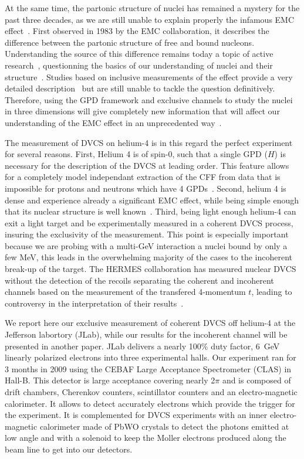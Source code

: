 \documentclass[%
 reprint,
 amsmath,amssymb,
 aps,
]{revtex4-1}
\begin{document}
At the same time, the partonic structure of nuclei has remained a mystery
for the past three decades, as we are still unable to explain properly the 
infamous EMC effect~\cite{}. First observed in 1983 by the EMC 
collaboration, it describes the difference between the partonic structure of
free and bound nucleons. Understanding the source of this difference remains 
today a topic of active research~\cite{},
questionning the basics of our understanding of nuclei and their 
structure~\cite{}. Studies based on inclusive measurements of the
effect provide a very detailed description~\cite{} but 
are still unable to tackle the question definitively. Therefore,
using the GPD framework and exclusive channels to study the nuclei in three 
dimensions will give completely new information that will affect our understanding
of the EMC effect in an unprecedented way~\cite{}. 

The measurement of DVCS on helium-4 is in this regard the perfect experiment for
several reasons. First, Helium 4 is of spin-0, such that a single GPD ($H$) is
necessary for the description of the DVCS at leading order. This feature allows for a
completely model independant extraction of the CFF from data that is impossible for 
protons and neutrons which have 4 GPDs~\cite{}. Second, 
helium 4 is dense and experience 
already a significant EMC effect, while being simple enough that its nuclear
structure is well known~\cite{}. Third, being 
light enough helium-4 can exit
a light target and be experimentally measured in a coherent DVCS process, 
insuring the exclusivity of the 
measurement. This point is especially important because we are probing with a 
multi-GeV interaction a nuclei bound by only a few MeV, this leads in the 
overwhelming majority of the cases to the incoherent break-up of the target.
The HERMES collaboration has measured nuclear DVCS~\cite{} without the 
detection of the recoils separating the coherent and incoherent channels 
based on the measurement of the transfered 4-momentum $t$, leading
to controversy in the interpretation of their results~\cite{}.

We report here our exclusive measurement of coherent DVCS off helium-4 
at the Jefferson labortory
(JLab), while our results for the incoherent channel will be presented in
another paper. JLab delivers a nearly 100\% duty factor, 6~GeV linearly 
polarized electrons into three experimental halls. Our experiment ran for 3 
months in 2009 using the CEBAF Large Acceptance Spectrometer (CLAS) in 
Hall-B. This detector is large acceptance covering nearly 2$\pi$ and is 
composed of drift chambers, Cherenkov counters, scintillator counters and 
an electro-magnetic calorimeter. It allows to detect accurately electrons 
which provide the trigger for the experiment. It is complemented for DVCS 
experiments with an inner electro-magnetic calorimeter made of PbWO crystals 
to detect the photons emitted at low angle and with a solenoid to keep the 
Moller electrons produced along the beam line to get into our detectors.
\end{document}
